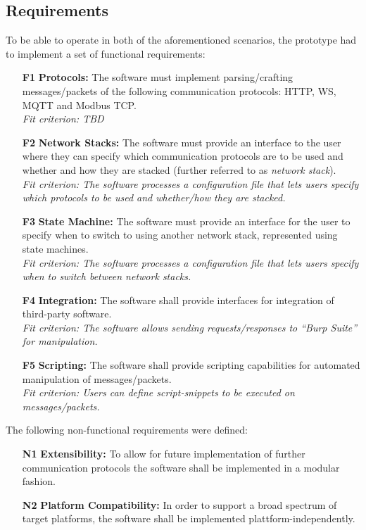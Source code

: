 \subsection{Requirements}
To be able to operate in both of the aforementioned scenarios, the prototype had to implement a set of functional requirements:
\begin{itemize}
    \item [\textbf{F1}] \textbf{Protocols:} The software must implement parsing/crafting messages/packets of the following communication protocols: \ac{HTTP}, \ac{WS}, \ac{MQTT} and Modbus \ac{TCP}. \\
    \textit{Fit criterion: TBD} %
    \item [\textbf{F2}] \textbf{Network Stacks:} The software must provide an interface to the user where they can specify which communication protocols are to be used and whether and how they are stacked (further referred to as \emph{network stack}).\\
    \textit{Fit criterion: The software processes a configuration file that lets users specify which protocols to be used and whether/how they are stacked.} 
    \item [\textbf{F3}] \textbf{State Machine:} The software must provide an interface for the user to specify when to switch to using another network stack, represented using state machines.\\
    \textit{Fit criterion: The software processes a configuration file that lets users specify when to switch between network stacks.}
    \item [\textbf{F4}] \textbf{Integration:} The software shall provide interfaces for integration of third-party software.\\
    \textit{Fit criterion: The software allows sending requests/responses to \enquote{Burp Suite} for manipulation.} %
    \item [\textbf{F5}] \textbf{Scripting:} The software shall provide scripting capabilities for automated manipulation of messages/packets.\\
    \textit{Fit criterion: Users can define script-snippets to be executed on messages/packets.} %
\end{itemize}

The following non-functional requirements were defined:

\begin{itemize}
    \item [\textbf{N1}] \textbf{Extensibility:} To allow for future implementation of further communication protocols the software shall be implemented in a modular fashion.
    \item [\textbf{N2}] \textbf{Platform Compatibility:} In order to support a broad spectrum of target platforms, the software shall be implemented plattform-independently.
\end{itemize}

